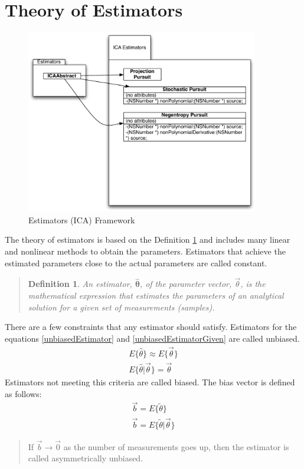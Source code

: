 \documentclass[11pt]{article}
\newtheorem{adef}[thm]{Definition}
\begin{document}
\section{Theory of Estimators}
\begin{figure}[htbp] %
   \centering
   \includegraphics[width=4in]{estimators.pdf} 
   \caption{Estimators (ICA) Framework}
   \label{fig-estimator-world}
\end{figure}
The theory of estimators is based on the Definition \ref{estimatorDefinition} and includes many linear and nonlinear methods to obtain the parameters.  %
Estimators that achieve the estimated parameters close to the actual parameters are called constant.  
\begin{quote}
	\begin{adef}
		\label{estimatorDefinition}
	An estimator, $\hat{\mathbf{\theta}}$, of the parameter vector, $\vec{\theta}$, is the mathematical expression that estimates the parameters of an analytical solution for a given set of measurements (samples).
	\end{adef}

\cite[78]{appo-ica-book}
\end{quote}
There are a few constraints that any estimator should satisfy.   Estimators for the equations \ref{unbiasedEstimator} and \ref{unbiasedEstimatorGiven} are called unbiased.  
\begin{eqnarray}
E \{ \hat{\theta} \} \approx E \{\vec{\theta} \} \label{unbiasedEstimator}\\
E \{ \hat{\theta} | \vec{\theta} \} = \vec{\theta} \label{unbiasedEstimatorGiven}
\end{eqnarray}
Estimators not meeting this criteria are called biased.  The bias vector is defined as follows:
\begin{eqnarray}
\vec{b} = E \{ \tilde {\theta} \} \\
\vec{b} = E \{ \tilde {\theta} | \vec{\theta} \} 
\end{eqnarray}
\begin{quote}
If $\vec{b} \to \vec{0}$ as the number of measurements goes up, then the estimator is called asymmetrically unbiased.
\cite[79]{appo-ica-book}
\end{quote}
\end{document}
